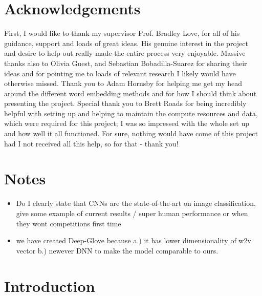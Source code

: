\documentclass[12pt]{report}
\begin{document}
\chapter*{Acknowledgements}
\thispagestyle{empty}
First, I would like to thank my supervisor Prof. Bradley Love, for all of his guidance, support and loads of great ideas. His genuine interest in the project and desire to help out really made the entire process very enjoyable. Massive thanks also to Olivia Guest, and Sebastian Bobadilla-Suarez for sharing their ideas and for pointing me to loads of relevant research I likely would have otherwise missed. Thank you to Adam Hornsby for helping me get my head around the different word embedding methods and for how I should think about presenting the project. Special thank you to Brett Roads for being incredibly helpful with setting up and helping to maintain the compute resources and data, which were required for this project; I was so impressed with the whole set up and how well it all functioned. For sure, nothing would have come of this project had I not received all this help, so for that - thank you!

\clearpage

\tableofcontents
\listoffigures
\listoftables
\setcounter{page}{1}

\chapter{Notes}
\begin{itemize}
    \item Do I clearly state that CNNs are the state-of-the-art on image classification, give some example of current results / super human performance or when they wont competitions first time
    \item we have created Deep-Glove because a.) it has lower dimensionality of w2v vector b.) newever DNN to make the model comparable to ours.
\end{itemize}

\chapter[Introduction]{Introduction\raisebox{.3\baselineskip}{\normalsize\footnotemark}}
\end{document}
